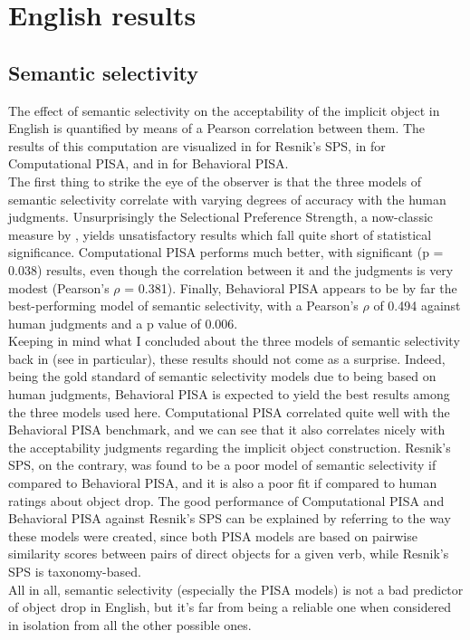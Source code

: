 \section{English results} 

\subsection{Semantic selectivity} 

The effect of semantic selectivity on the acceptability of the implicit object in English is quantified by means of a Pearson correlation between them. The results of this computation are visualized in  for Resnik's SPS, in  for Computational PISA, and in  for Behavioral PISA.\\
The first thing to strike the eye of the observer is that the three models of semantic selectivity correlate with varying degrees of accuracy with the human judgments. Unsurprisingly the Selectional Preference Strength, a now-classic measure by \textcite{Resnik1993,Resnik1996}, yields unsatisfactory results which fall quite short of statistical significance. Computational PISA performs much better, with significant (p = 0.038) results, even though the correlation between it and the judgments is very modest (Pearson's $\rho$ = 0.381). Finally, Behavioral PISA appears to be by far the best-performing model of semantic selectivity, with a Pearson's $\rho$ of 0.494 against human judgments and a p value of 0.006.\\ 
Keeping in mind what I concluded about the three models of semantic selectivity back in  (see  in particular), these results should not come as a surprise. Indeed, being the gold standard of semantic selectivity models due to being based on human judgments, Behavioral PISA is expected to yield the best results among the three models used here. Computational PISA correlated quite well with the Behavioral PISA benchmark, and we can see that it also correlates nicely with the acceptability judgments regarding the implicit object construction. Resnik's SPS, on the contrary, was found to be a poor model of semantic selectivity if compared to Behavioral PISA, and it is also a poor fit if compared to human ratings about object drop. The good performance of Computational PISA and Behavioral PISA against Resnik's SPS can be explained by referring to the way these models were created, since both PISA models are based on pairwise similarity scores between pairs of direct objects for a given verb, while Resnik's SPS is taxonomy-based.\\
All in all, semantic selectivity (especially the PISA models) is not a bad predictor of object drop in English, but it's far from being a reliable one when considered in isolation from all the other possible ones.

